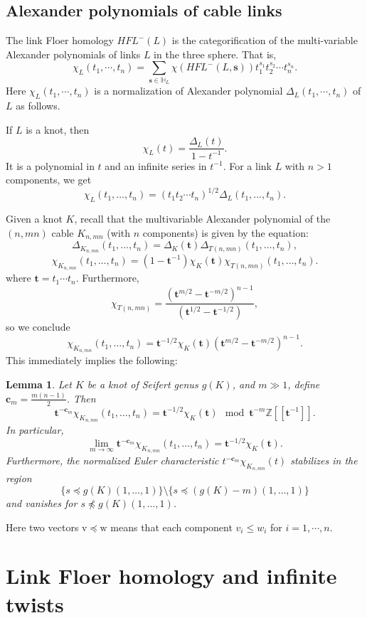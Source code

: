\documentclass{amsart}
\newtheorem{lemma}[theorem]{Lemma}
\newcommand{\HFL}{\mathit{HFL}}
\newcommand{\HH}{\mathbb{H}}
\newcommand{\cc}{\mathbf{c}}
\newcommand{\ttt}{\mathbf{t}}
\renewcommand{\ss}{\mathbf{s}}
\begin{document}
\subsection{Alexander polynomials of cable links}
\label{sec: alex cable}
The link Floer homology $\HFL^-(L)$ is the categorification of the multi-variable Alexander polynomials of links $L$ in the three sphere. That is, 
$$\chi_L(t_1, \cdots, t_n)=\sum_{\ss\in \HH_L} \chi(\HFL^-(L, \ss))t_1^{s_1} t_2^{s_2}\cdots t_n^{s_n}.$$
Here $\chi_L(t_1, \cdots, t_n)$ is a normalization of Alexander polynomial $\Delta_L(t_1, \cdots, t_n)$ of $L$ as follows. 

If $L$ is a knot, then
$$
\chi_{L}(t)=\frac{\Delta_{L}(t)}{1-t^{-1}}.
$$
It is a polynomial in $t$ and an infinite series in $t^{-1}$. For a link $L$ with $n>1$ components, we get
$$
\chi_{L}(t_1,\ldots,t_n)=(t_1 t_2\cdots t_n)^{1/2}\Delta_{L}(t_1,\ldots,t_n).
$$

Given a knot $K$, recall that the multivariable Alexander polynomial of the $(n,mn)$ cable $K_{n,mn}$ (with $n$ components) is given  by the equation:
$$
\Delta_{K_{n,mn}}(t_1,\ldots,t_n)=\Delta_{K}(\ttt)\Delta_{T(n,mn)}(t_1,\ldots,t_n),
$$
$$
 \chi_{K_{n,mn}}(t_1,\ldots,t_n)=(1-\ttt^{-1})\chi_{K}(\ttt)\chi_{T(n,mn)}(t_1,\ldots,t_n).
$$
where $\ttt=t_1\cdots t_n$. Furthermore,
$$
\chi_{T(n,mn)}=\frac{(\ttt^{m/2}-\ttt^{-m/2})^{n-1}}{(\ttt^{1/2}-\ttt^{-1/2})},
$$ 
so we conclude
\begin{equation}
\chi_{K_{n,mn}}(t_1,\ldots,t_n)=\ttt^{-1/2}\chi_{K}(\ttt)(\ttt^{m/2}-\ttt^{-m/2})^{n-1}.
\end{equation}
This immediately implies the following:
\begin{lemma}
\label{lem: Alex stable}
Let $K$ be a knot of Seifert genus $g(K)$, and $m\gg 1$, define $\cc_m=\frac{m(n-1)}{2}$. Then 
$$
\ttt^{-\cc_m}\chi_{K_{n,mn}}(t_1,\ldots,t_n)=\ttt^{-1/2}\chi_{K}(\ttt)\mod \ttt^{-m}\mathbb{Z}[[\ttt^{-1}]].
$$
In particular,
$$
\lim_{m\to \infty}\ttt^{-\cc_m}\chi_{K_{n,mn}}(t_1,\ldots,t_n)=\ttt^{-1/2}\chi_{K}(\ttt).
$$
Furthermore, the normalized Euler characteristic $t^{-\cc_m}\chi_{K_{n,mn}}(t)$ stabilizes in the region 
$$\{s\preceq g(K)(1,\ldots,1)\}\setminus \{s\preceq (g(K)-m)(1,\ldots,1)\}$$ and vanishes for $s\not\preceq g(K)(1,\ldots,1)$.
\end{lemma}

Here two vectors $\mathrm{v}\preceq \mathrm{w}$ means that each component $v_i\leq w_i$ for $i=1, \cdots, n$. 

\section{Link Floer homology and infinite twists}
\label{sec: construction}
\end{document}
